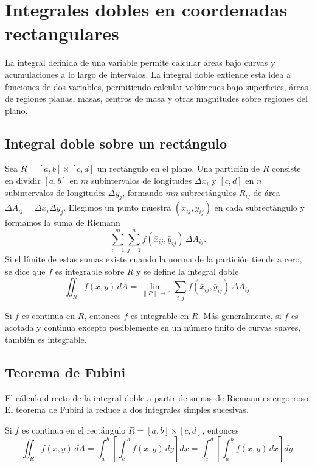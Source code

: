 \section{Integrales dobles en coordenadas rectangulares}

La integral definida de una variable permite calcular áreas bajo curvas y acumulaciones a lo largo de intervalos. La integral doble extiende esta idea a funciones de dos variables, permitiendo calcular volúmenes bajo superficies, áreas de regiones planas, masas, centros de masa y otras magnitudes sobre regiones del plano.

\subsection{Integral doble sobre un rectángulo}

Sea $R=[a,b]\times[c,d]$ un rectángulo en el plano. Una partición de $R$ consiste en dividir $[a,b]$ en $m$ subintervalos de longitudes $\Delta x_i$ y $[c,d]$ en $n$ subintervalos de longitudes $\Delta y_j$, formando $mn$ subrectángulos $R_{ij}$ de área $\Delta A_{ij}=\Delta x_i\Delta y_j$. Elegimos un punto muestra $(\bar{x}_{ij},\bar{y}_{ij})$ en cada subrectángulo y formamos la suma de Riemann
\[
\sum_{i=1}^m\sum_{j=1}^n f(\bar{x}_{ij},\bar{y}_{ij})\,\Delta A_{ij}.
\]
Si el límite de estas sumas existe cuando la norma de la partición tiende a cero, se dice que $f$ es integrable sobre $R$ y se define la integral doble
\[
\iint_R f(x,y)\,dA = \lim_{\|P\|\to0}\sum_{i,j} f(\bar{x}_{ij},\bar{y}_{ij})\,\Delta A_{ij}.
\]

\begin{theorem}[Integrabilidad]
Si $f$ es continua en $R$, entonces $f$ es integrable en $R$. Más generalmente, si $f$ es acotada y continua excepto posiblemente en un número finito de curvas suaves, también es integrable.
\end{theorem}

\subsection{Teorema de Fubini}

El cálculo directo de la integral doble a partir de sumas de Riemann es engorroso. El teorema de Fubini la reduce a dos integrales simples sucesivas.

\begin{theorem}[Fubini]
Si $f$ es continua en el rectángulo $R=[a,b]\times[c,d]$, entonces
\[
\iint_R f(x,y)\,dA = \int_a^b\left[\int_c^d f(x,y)\,dy\right]dx
= \int_c^d\left[\int_a^b f(x,y)\,dx\right]dy.
\]
\end{theorem}

